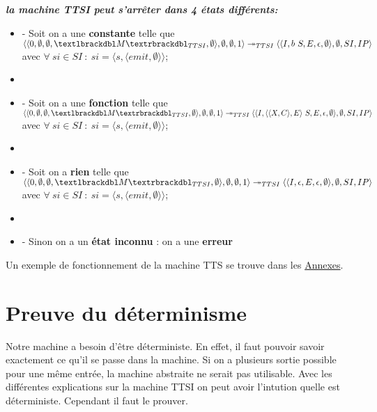 \documentclass[10pt,a4paper]{report}
\begin{document}
	
\textbf{\textit{la machine TTSI peut s'arrêter dans 4 états différents:}}
\smallbreak
\begin{itemize}
	\item[] - Soit on a une \textbf{constante} telle que 
	$\langle\langle 0,\emptyset,\emptyset,\textlbrackdbl M\textrbrackdbl_{TTSI},\emptyset\rangle,\emptyset,\emptyset,1\rangle 
	\twoheadrightarrow_{TTSI} 
	\langle\langle I,b~S,E,\epsilon,\emptyset\rangle,\emptyset,SI,IP\rangle$
	\\ avec $\forall~si \in SI~:~si = \langle s,\langle emit,\emptyset\rangle\rangle$;
	\item[] 
	\item[] - Soit on a une \textbf{fonction} telle que
	$\langle\langle 0,\emptyset,\emptyset,\textlbrackdbl M\textrbrackdbl_{TTSI},\emptyset\rangle,\emptyset,\emptyset,1\rangle 
	\twoheadrightarrow_{TTSI} 
	\langle\langle I,\langle\langle X,C\rangle,E\rangle~S,E,\epsilon,\emptyset\rangle,\emptyset,SI,IP\rangle$
	\\ avec $\forall~si \in SI~:~si = \langle s,\langle emit,\emptyset\rangle\rangle$;
	\item[] 
	\item[] - Soit on a \textbf{rien} telle que  
	$\langle\langle 0,\emptyset,\emptyset,\textlbrackdbl M\textrbrackdbl_{TTSI},\emptyset\rangle,\emptyset,\emptyset,1\rangle 
	\twoheadrightarrow_{TTSI} 
	\langle\langle I,\epsilon,E,\epsilon,\emptyset\rangle,\emptyset,SI,IP\rangle$
	\\ avec $\forall~si \in SI~:~si = \langle s,\langle emit,\emptyset\rangle\rangle$;
	\item[]
	\item[] - Sinon on a un \textbf{état inconnu} : on a une \textbf{erreur} 
\end{itemize}
\bigbreak


 Un exemple de fonctionnement de la machine TTS se trouve dans les \hyperref[TTSI]{Annexes}.
\newpage
	
	\section{Preuve du déterminisme}
	
	Notre machine a besoin d'être déterministe. En effet, il faut pouvoir savoir exactement ce qu'il se passe dans la machine. Si on a plusieurs sortie possible pour une même entrée, la machine abstraite ne serait pas utilisable. Avec les différentes explications sur la machine TTSI on peut avoir l'intution quelle est déterministe. Cependant il faut le prouver.
	\medbreak
	
\end{document}

